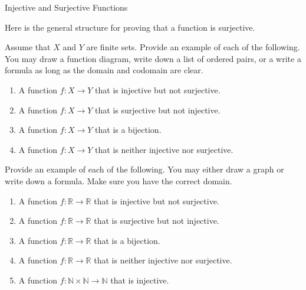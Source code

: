 \begin{section}{Injective and Surjective Functions}
\begin{skeleton}
Here is the general structure for proving that a function is surjective.
\begin{center}
\end{center}
\end{skeleton}

\begin{problem}
Assume that $X$ and $Y$ are finite sets. Provide an example of each of the following.  You may draw a function diagram, write down a list of ordered pairs, or a write a formula as long as the domain and codomain are clear. 
\begin{enumerate}[label=\textrm{(\alph*)}]
\item A function $f:X\to Y$ that is injective but not surjective.
\item A function $f:X\to Y$ that is surjective but not injective.
\item A function $f:X\to Y$ that is a bijection.
\item A function $f:X\to Y$ that is neither injective nor surjective.
\end{enumerate}
\end{problem}

\begin{problem}
Provide an example of each of the following.  You may either draw a graph or write down a formula.  Make sure you have the correct domain.
\begin{enumerate}[label=\textrm{(\alph*)}]
\item A function $f:\mathbb{R}\to \mathbb{R}$ that is injective but not surjective.
\item A function $f:\mathbb{R}\to \mathbb{R}$ that is surjective but not injective.
\item A function $f:\mathbb{R}\to \mathbb{R}$ that is a bijection.
\item A function $f:\mathbb{R}\to \mathbb{R}$ that is neither injective nor surjective.
\item A function $f:\mathbb{N}\times\mathbb{N}\to \mathbb{N}$ that is injective.
\end{enumerate}
\end{problem}


\end{section}

